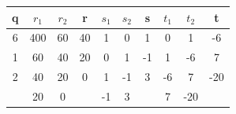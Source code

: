 \documentclass[a4paper]{exam}
\begin{document}
\begin{questions}
        \begin{solution}
            \begin{table}[H]
                \begin{center}
                    \begin{tabular}{cccccccccc}
                    \hline
                    \multicolumn{1}{|c|}{\textbf{q}}               & \multicolumn{1}{c|}{\textbf{$r_1$}} & \multicolumn{1}{c|}{\textbf{$r_2$}} & \multicolumn{1}{c|}{\textbf{r}}               & \multicolumn{1}{c|}{\textbf{$s_1$}} & \multicolumn{1}{c|}{\textbf{$s_2$}} & \multicolumn{1}{c|}{\textbf{s}}               & \multicolumn{1}{c|}{\textbf{$t_1$}} & \multicolumn{1}{c|}{\textbf{$t_2$}} & \multicolumn{1}{c|}{\textbf{t}}               \\ \hline
                    \multicolumn{1}{|c|}{6}                        & \multicolumn{1}{c|}{400}            & \multicolumn{1}{c|}{60}             & \multicolumn{1}{c|}{40}                       & \multicolumn{1}{c|}{1}              & \multicolumn{1}{c|}{0}              & \multicolumn{1}{c|}{1}                        & \multicolumn{1}{c|}{0}              & \multicolumn{1}{c|}{1}              & \multicolumn{1}{c|}{-6}                       \\ \hline
                    \multicolumn{1}{|c|}{1}                        & \multicolumn{1}{c|}{60}             & \multicolumn{1}{c|}{40}             & \multicolumn{1}{c|}{20}                       & \multicolumn{1}{c|}{0}              & \multicolumn{1}{c|}{1}              & \multicolumn{1}{c|}{-1}                       & \multicolumn{1}{c|}{1}              & \multicolumn{1}{c|}{-6}             & \multicolumn{1}{c|}{7}                        \\ \hline
                    \multicolumn{1}{|c|}{2}                        & \multicolumn{1}{c|}{40}             & \multicolumn{1}{c|}{20}             & \multicolumn{1}{c|}{0}                        & \multicolumn{1}{c|}{1}              & \multicolumn{1}{c|}{-1}             & \multicolumn{1}{c|}{3}                        & \multicolumn{1}{c|}{-6}             & \multicolumn{1}{c|}{7}              & \multicolumn{1}{c|}{-20}                      \\ \hline
                    \multicolumn{1}{|c|}{}                         & \multicolumn{1}{c|}{20}             & \multicolumn{1}{c|}{0}              & \multicolumn{1}{c|}{}                         & \multicolumn{1}{c|}{-1}             & \multicolumn{1}{c|}{3}              & \multicolumn{1}{c|}{}                         & \multicolumn{1}{c|}{7}              & \multicolumn{1}{c|}{-20}            & \multicolumn{1}{c|}{}                         \\ \hline

\end{tabular}
\end{center}
\end{table}
\end{solution}
\end{questions}
\end{document}
